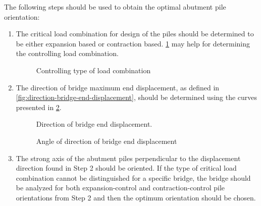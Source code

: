 The following steps should be used to obtain the optimal abutment pile orientation:
\begin{enumerate}
  \item The critical load combination for design of the piles should be determined to be either expansion based or contraction based. \cref{fig:control-type-load-combination} may help for determining the controlling load combination.
  \begin{figure}
    \caption{Controlling type of load combination}
    \label{fig:control-type-load-combination}
  \end{figure}
  \item The direction of bridge maximum end displacement, as defined in \cref{fig:direction-bridge-end-displacement}, should be determined using the curves presented in \cref{fig:angle-direction-bridge-end-displacement}.
  \begin{figure}
    \begin{minipage}{0.5\linewidth}\centering
      \caption{Direction of bridge end displacement.}
      \label{fig:direction-bridge-end-displacement}
    \end{minipage}
    \begin{minipage}{0.5\linewidth}\centering
      \caption{Angle of direction of bridge end displacement}
      \label{fig:angle-direction-bridge-end-displacement}
    \end{minipage}%
  \end{figure}
  \item The strong axis of the abutment piles perpendicular to the displacement direction found in Step 2 should be oriented. If the type of critical load combination cannot be distinguished for a specific bridge, the bridge should be analyzed for both expansion-control and contraction-control pile orientations from Step 2 and then the optimum orientation should be chosen.
\end{enumerate}